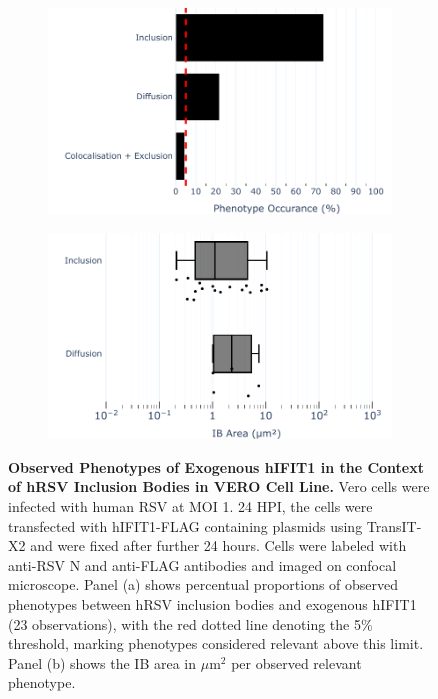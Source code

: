 \begin{figure}
    \begin{subfigure}{0.495\textwidth}
        \caption{}
        \includegraphics[width=1\linewidth]{09. Chapter 4/Figs/02. Overexpression/01. IFIT1/01. bar_i1_hrsv.pdf} 
    \end{subfigure}
    \begin{subfigure}{0.495\textwidth}
        \caption{}
        \includegraphics[width=1\linewidth]{09. Chapter 4/Figs/02. Overexpression/01. IFIT1/02. box_i1_hrsv.pdf}
    \end{subfigure}
    \caption[Observed Phenotypes of Exogenous hIFIT1 in the Context of hRSV Inclusion Bodies in VERO Cell Line.]{\textbf{Observed Phenotypes of Exogenous hIFIT1 in the Context of hRSV Inclusion Bodies in VERO Cell Line.} Vero cells were infected with human RSV at MOI 1. 24 HPI, the cells were transfected with hIFIT1-FLAG containing plasmids using TransIT-X2 and were fixed after further 24 hours. Cells were labeled with anti-RSV N and anti-FLAG antibodies and imaged on confocal microscope. Panel (a) shows percentual proportions of observed phenotypes between hRSV inclusion bodies and exogenous hIFIT1 (23 observations), with the red dotted line denoting the 5\% threshold, marking phenotypes considered relevant above this limit. Panel (b) shows the IB area in \(\mu \mbox{m}^2\) per observed relevant phenotype.}
    \label{fig:Observed Phenotypes of Exogenous hIFIT1 in the Context of hRSV Inclusion Bodies in VERO Cell Line}
\end{figure}

